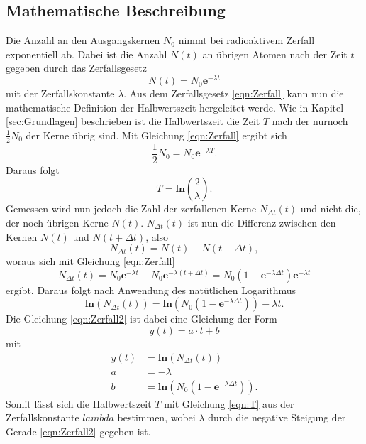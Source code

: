 \subsection{Mathematische Beschreibung}
\label{sec:mathe}
Die Anzahl an den Ausgangskernen $N_0$ nimmt bei radioaktivem Zerfall exponentiell ab. Dabei ist die 
Anzahl $N(t)$ an übrigen Atomen nach der Zeit $t$ gegeben durch das Zerfallsgesetz
\begin{equation}
    N(t)=N_0\textbf{e}^{-\lambda t} 
    \label{eqn:Zerfall}
\end{equation}
mit der Zerfallskonstante $\lambda$. Aus dem Zerfallsgesetz \ref{eqn:Zerfall} kann nun die mathematische
Definition der Halbwertszeit hergeleitet werde. Wie in Kapitel \ref{sec:Grundlagen} beschrieben ist die 
Halbwertszeit die Zeit $T$ nach der nurnoch $\frac{1}{2}N_0$ der Kerne übrig sind. Mit Gleichung 
\ref{eqn:Zerfall} ergibt sich
\begin{equation*}
    \frac{1}{2}N_0=N_0\textbf{e}^{-\lambda T}.
\end{equation*}
Daraus folgt 
\begin{equation}
    T=\textbf{ln}\left(\frac{2}{\lambda}\right) 
    \label{eqn:T}.
\end{equation}
Gemessen wird nun jedoch die Zahl der zerfallenen Kerne $N_{\Delta t}(t)$ und nicht die, der noch übrigen
Kerne $N(t)$. $N_{\Delta t}(t)$ ist nun die Differenz zwischen den Kernen $N(t)$ und $N(t+\Delta t)$, 
also
\begin{equation*}
    N_{\Delta t}(t)=N(t)-N(t+\Delta t) 
    \label{eqn:Zerfall},
\end{equation*}
woraus sich mit Gleichung \ref{eqn:Zerfall}
\begin{equation*}
    N_{\Delta t}(t)=N_0\textbf{e}^{-\lambda t}-N_0\textbf{e}^{-\lambda (t+\Delta t)}
    =N_0(1-\textbf{e}^{-\lambda \Delta t})\textbf{e}^{-\lambda t}
\end{equation*}
ergibt. Daraus folgt nach Anwendung des natütlichen Logarithmus 
\begin{equation}
    \textbf{ln}(N_{\Delta t}(t))
    =\textbf{ln}(N_0(1-\textbf{e}^{-\lambda \Delta t}))-\lambda t 
    \label{eqn:Zerfall2}.
\end{equation}
Die Gleichung \ref{eqn:Zerfall2} ist dabei eine Gleichung der Form 
\begin{equation}
    y(t)=a\cdot t+b 
    \label{eqn:gerade}
\end{equation}
mit
\begin{align*}
    y(t)&=\textbf{ln}(N_{\Delta t}(t))\\
    a&=-\lambda\\
    b&=\textbf{ln}(N_0(1-\textbf{e}^{-\lambda \Delta t})).
\end{align*}
Somit lässt sich die Halbwertszeit $T$ mit Gleichung \ref{eqn:T} aus der Zerfallskonstante $lambda$
bestimmen, wobei $\lambda$ durch die negative Steigung der Gerade \ref{eqn:Zerfall2} gegeben ist.

